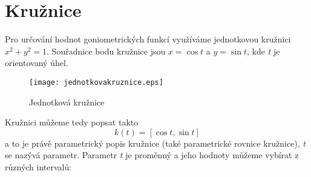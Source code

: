 \section{Kružnice}
Pro určování hodnot goniometrických funkcí využíváme jednotkovou kružnici $x^2+y^2=1$.
Souřadnice bodu kružnice jsou $x=\cos{t}$ a $y=\sin{t}$, kde \textit{t} je orientovaný úhel.
\begin{figure}[H]
	\centering
	\texttt{[image: jednotkovakruznice.eps]}
	\caption{Jednotková kružnice}
\end{figure}
\noindent Kružnici můžeme tedy popsat takto
$$k(t)=[\cos{t}, \sin{t}]$$
a to je právě parametrický popis kružnice (také parametrické rovnice kružnice), \textit{t} se nazývá
parametr. Parametr \textit{t} je proměnný a jeho hodnoty můžeme vybírat z různých intervalů: \\
